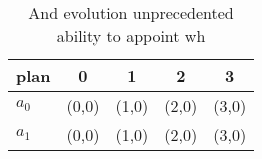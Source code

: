 \documentclass[a4paper]{article}
\begin{document}
\begin{table}
\begin{adjustbox}{width=0.6\columnwidth}
\begin{tabular}{|l|l|l|l|l|}
\hline
\textbf{plan} & \multicolumn{1}{c|}{\textbf{0}} & \multicolumn{1}{c|}{\textbf{1}} & \multicolumn{1}{c|}{\textbf{2}} & \multicolumn{1}{c|}{\textbf{3}} \\ \hline
\textbf{$a_0$}  & (0,0) & (1,0) & (2,0) & (3,0) \\ \hline
\textbf{$a_1$}  & (0,0) & (1,0) & (2,0) & (3,0) \\ \hline
\end{tabular}
\end{adjustbox}
\caption{And evolution unprecedented ability to appoint wh
}
\end{table}
\end{document}
